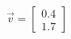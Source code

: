 \documentclass[preview]{standalone}
\begin{document}
\begin{align*}
\vec{v}=\begin{bmatrix}0.4\\1.7\end{bmatrix}
\end{align*}
\end{document}
